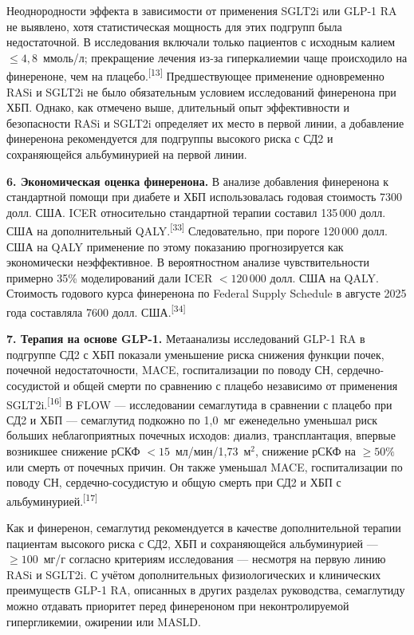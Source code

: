 \documentclass[11pt,a4paper]{article}
\newcommand{\src}[1]{\textsuperscript{[#1]}}
\newcommand{\unitgfr}{мл/мин/1,73~м$^2$}
\begin{document}
Неоднородности эффекта в зависимости от применения SGLT2i или GLP-1 RA не выявлено, хотя статистическая мощность для этих подгрупп была недостаточной. В исследования включали только пациентов с исходным калием $\leq4{,}8$~ммоль/л; прекращение лечения из-за гиперкалиемии чаще происходило на финереноне, чем на плацебо.\src{13} Предшествующее применение одновременно RASi и SGLT2i не было обязательным условием исследований финеренона при ХБП. Однако, как отмечено выше, длительный опыт эффективности и безопасности RASi и SGLT2i определяет их место в первой линии, а добавление финеренона рекомендуется для подгруппы высокого риска с СД2 и сохраняющейся альбуминурией на первой линии.

\textbf{6. Экономическая оценка финеренона.} В анализе добавления финеренона к стандартной помощи при диабете и ХБП использовалась годовая стоимость 7300 долл. США. ICER относительно стандартной терапии составил 135\,000 долл. США на дополнительный QALY.\src{33} Следовательно, при пороге 120\,000 долл. США на QALY применение по этому показанию прогнозируется как экономически неэффективное. В вероятностном анализе чувствительности примерно 35\% моделирований дали ICER $<120\,000$ долл. США на QALY. Стоимость годового курса финеренона по Federal Supply Schedule в августе 2025 года составляла 7600 долл. США.\src{34}

\textbf{7. Терапия на основе GLP-1.} Метаанализы исследований GLP-1 RA в подгруппе СД2 с ХБП показали уменьшение риска снижения функции почек, почечной недостаточности, MACE, госпитализации по поводу СН, сердечно-сосудистой и общей смерти по сравнению с плацебо независимо от применения SGLT2i.\src{16} В FLOW --- исследовании семаглутида в сравнении с плацебо при СД2 и ХБП --- семаглутид подкожно по 1,0~мг еженедельно уменьшал риск больших неблагоприятных почечных исходов: диализ, трансплантация, впервые возникшее снижение рСКФ $<15$~\unitgfr, снижение рСКФ на $\geq50\%$ или смерть от почечных причин. Он также уменьшал MACE, госпитализации по поводу СН, сердечно-сосудистую и общую смерть при СД2 и ХБП с альбуминурией.\src{17}

Как и финеренон, семаглутид рекомендуется в качестве дополнительной терапии пациентам высокого риска с СД2, ХБП и сохраняющейся альбуминурией --- $\geq100$~мг/г согласно критериям исследования --- несмотря на первую линию RASi и SGLT2i. С учётом дополнительных физиологических и клинических преимуществ GLP-1 RA, описанных в других разделах руководства, семаглутиду можно отдавать приоритет перед финереноном при неконтролируемой гипергликемии, ожирении или MASLD.
\end{document}

